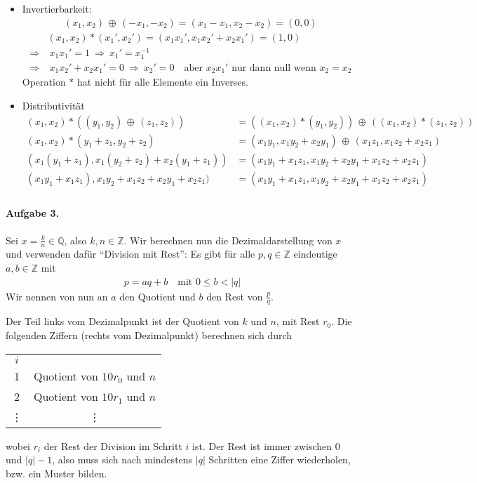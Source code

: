 \documentclass{article}
\newcommand{\xor}{\, \oplus\, }
\begin{document}
\begin{itemize}
    \item Invertierbarkeit:
    \begin{align*}
        (x_1, x_2) \xor (-x_1, -x_2) = (x_1 - x_1, x_2 - x_2) = (0, 0)
    \end{align*}
    \begin{align*}
        &(x_1, x_2) * (x_1', x_2') = (x_1x_1', x_1x_2' + x_2x_1') = (1, 0) \\
        \Rightarrow&\  x_1x_1' = 1\ \Rightarrow\ x_1' = x_1^{-1} \\
        \Rightarrow&\  x_1x_2' + x_2x_1' = 0\ \Rightarrow\ x_2' = 0 \quad \text{aber $x_2x_1'$ nur dann null wenn $x_2 = x_2$}
    \end{align*}
    Operation $*$ hat nicht für alle Elemente ein Inverses.

    \item Distributivität
    \begin{align*}
        (x_1, x_2) * ((y_1, y_2) \xor (z_1, z_2)) &= ((x_1, x_2) * (y_1, y_2)) \xor ((x_1, x_2) * (z_1, z_2)) \\
        (x_1, x_2) * (y_1 + z_1, y_2 + z_2) &= (x_1y_1, x_1y_2 + x_2y_1) \xor (x_1z_1, x_1z_2 + x_2z_1) \\
        (x_1(y_1 + z_1), x_1(y_2 + z_2) + x_2(y_1 + z_1)) &= (x_1y_1 + x_1z_1, x_1y_2 + x_2y_1 + x_1z_2 + x_2z_1) \\
        (x_1y_1 + x_1z_1), x_1y_2 + x_1z_2 + x_2y_1 + x_2z_1) &= (x_1y_1 + x_1z_1, x_1y_2 + x_2y_1 + x_1z_2 + x_2z_1) \\
    \end{align*}
\end{itemize}

\paragraph{Aufgabe 3.} Sei $x = \frac{k}{n} \in \mathbb{Q}$, also $k, n \in \mathbb{Z}$. Wir berechnen nun die Dezimaldarstellung von $x$ und verwenden dafür \enquote{Division mit Rest}: Es gibt für alle $p, q \in \mathbb{Z}$ eindeutige $a, b \in \mathbb{Z}$ mit
\begin{align*}
    p = aq + b \quad \text{mit $0 \leq b < |q|$}
\end{align*}
Wir nennen von nun an $a$ den Quotient und $b$ den Rest von $\frac{p}{q}$.

Der Teil links vom Dezimalpunkt ist der Quotient von $k$ und $n$, mit Rest $r_0$. Die folgenden Ziffern (rechts vom Dezimalpunkt) berechnen sich durch
\begin{center}
    \begin{tabular}{c c}
        $i$ &  \\
        1 & Quotient von $10r_0$ und $n$ \\
        2 & Quotient von $10r_1$ und $n$\\
        \vdots & \vdots \\
    \end{tabular}
\end{center}
wobei $r_i$ der Rest der Division im Schritt $i$ ist. Der Rest ist immer zwischen 0 und $|q| - 1$, also muss sich nach mindestens $|q|$ Schritten eine Ziffer wiederholen, bzw. ein Muster bilden.
\end{document}
